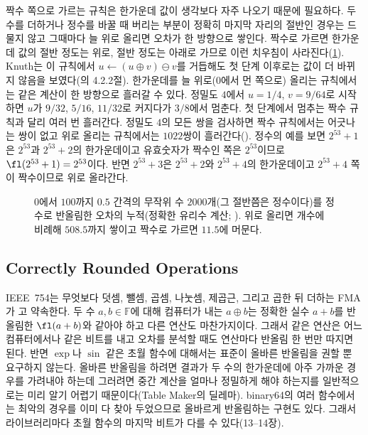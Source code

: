 짝수 쪽으로 가르는 규칙은 한가운데 값이 생각보다 자주 나오기 때문에 필요하다. 두 수를 더하거나 정수를 바꿀 때 버리는 부분이 정확히 마지막 자리의 절반인 경우는 드물지 않고 그때마다 늘 위로 올리면 오차가 한 방향으로 쌓인다. 짝수로 가르면 한가운데 값의 절반 정도는 위로, 절반 정도는 아래로 가므로 이런 치우침이 사라진다(\cref{fig:bias}). Knuth는 이 규칙에서 $u\gets(u\oplus v)\ominus v$를 거듭해도 첫 단계 이후로는 값이 더 바뀌지 않음을 보였다(\cite{knuth1997taocp2}의 4.2.2절). 한가운데를 늘 위로(0에서 먼 쪽으로) 올리는 규칙에서는 같은 계산이 한 방향으로 흘러갈 수 있다. 정밀도 $4$에서 $u=1/4$, $v=9/64$로 시작하면 $u$가 $9/32$, $5/16$, $11/32$로 커지다가 $3/8$에서 멈춘다. 첫 단계에서 멈추는 짝수 규칙과 달리 여러 번 흘러간다. 정밀도 $4$의 모든 쌍을 검사하면 짝수 규칙에서는 어긋나는 쌍이 없고 위로 올리는 규칙에서는 $1022$쌍이 흘러간다(). 정수의 예를 보면 $2^{53}+1$은 $2^{53}$과 $2^{53}+2$의 한가운데이고 유효숫자가 짝수인 쪽은 $2^{53}$이므로 $\fl(2^{53}+1)=2^{53}$이다. 반면 $2^{53}+3$은 $2^{53}+2$와 $2^{53}+4$의 한가운데이고 $2^{53}+4$ 쪽이 짝수이므로 위로 올라간다.

\begin{figure}[htbp]
\centering
{}
\caption{$0$에서 $100$까지 $0.5$ 간격의 무작위 수 $2000$개(그 절반쯤은 정수이다)를 정수로 반올림한 오차의 누적(정확한 유리수 계산; ). 위로 올리면 개수에 비례해 $508.5$까지 쌓이고 짝수로 가르면 $11.5$에 머문다.}
\label{fig:bias}
\end{figure}

\subsection{Correctly Rounded Operations}

IEEE~754는 무엇보다 덧셈, 뺄셈, 곱셈, 나눗셈, 제곱근, 그리고 곱한 뒤 더하는 FMA가 고 약속한다. 두 수 $a,b\in\mathbb F$에 대해 컴퓨터가 내는 $a\oplus b$는 정확한 실수 $a+b$를 반올림한 $\fl(a+b)$와 같아야 하고 다른 연산도 마찬가지이다\cite{ieee754-2019}. 그래서 같은 연산은 어느 컴퓨터에서나 같은 비트를 내고 오차를 분석할 때도 연산마다 반올림 한 번만 따지면 된다. 반면 $\exp$나 $\sin$ 같은 초월 함수에 대해서는 표준이 올바른 반올림을 권할 뿐 요구하지 않는다. 올바른 반올림을 하려면 결과가 두 수의 한가운데에 아주 가까운 경우를 가려내야 하는데 그러려면 중간 계산을 얼마나 정밀하게 해야 하는지를 일반적으로는 미리 알기 어렵기 때문이다(Table Maker의 딜레마). binary64의 여러 함수에서는 최악의 경우를 이미 다 찾아 두었으므로 올바르게 반올림하는 구현도 있다. 그래서 라이브러리마다 초월 함수의 마지막 비트가 다를 수 있다(13--14장).

